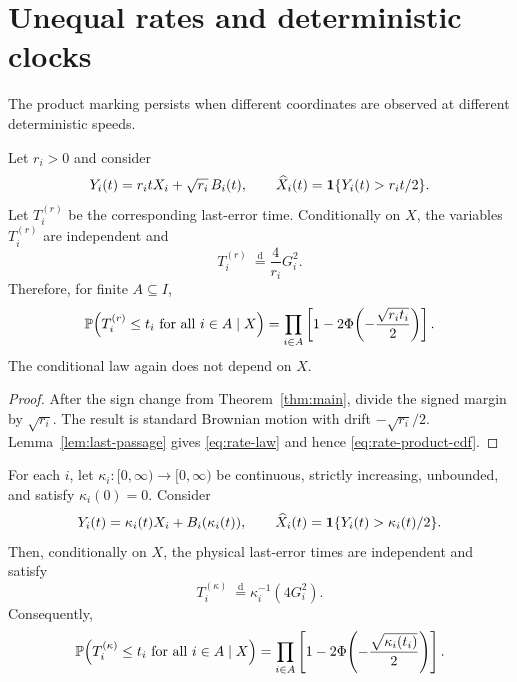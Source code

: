 \section{Unequal rates and deterministic clocks}

The product marking persists when different coordinates are observed at
different deterministic speeds.

\begin{proposition}\label{prop:rates}
Let $r_i>0$ and consider
\begin{equation}\label{eq:rate-model}
  Y_i(t)=r_itX_i+\sqrt{r_i}\,B_i(t),
  \qquad
  \widehat X_i(t)=\1\{Y_i(t)>r_it/2\}.
\end{equation}
Let $T_i^{(r)}$ be the corresponding last-error time.  Conditionally on $X$,
the variables $T_i^{(r)}$ are independent and
\begin{equation}\label{eq:rate-law}
  T_i^{(r)}\ \stackrel{\mathrm d}{=}\frac4{r_i}G_i^2.
\end{equation}
Therefore, for finite $A\subseteq I$,
\begin{equation}\label{eq:rate-product-cdf}
  \P\!\left(T_i^{(r)}\le t_i\ \text{for all }i\in A\mid X\right)
  =\prod_{i\in A}
  \left[1-2\Phi\!\left(-\frac{\sqrt{r_it_i}}2\right)\right].
\end{equation}
The conditional law again does not depend on $X$.
\end{proposition}

\begin{proof}
After the sign change from Theorem~\ref{thm:main}, divide the signed margin by
$\sqrt{r_i}$.  The result is standard Brownian motion with drift
$-\sqrt{r_i}/2$.  Lemma~\ref{lem:last-passage} gives
\eqref{eq:rate-law} and hence \eqref{eq:rate-product-cdf}.
\end{proof}

\begin{proposition}\label{prop:clocks}
For each $i$, let $\kappa_i:[0,\infty)\to[0,\infty)$ be continuous, strictly
increasing, unbounded, and satisfy $\kappa_i(0)=0$.  Consider
\begin{equation}\label{eq:clock-model}
  Y_i(t)=\kappa_i(t)X_i+B_i(\kappa_i(t)),
  \qquad
  \widehat X_i(t)=\1\{Y_i(t)>\kappa_i(t)/2\}.
\end{equation}
Then, conditionally on $X$, the physical last-error times are independent and
satisfy
\begin{equation}\label{eq:clock-transform}
  T_i^{(\kappa)}\ \stackrel{\mathrm d}{=}
  \kappa_i^{-1}(4G_i^2).
\end{equation}
Consequently,
\begin{equation}\label{eq:clock-product-cdf}
  \P\!\left(T_i^{(\kappa)}\le t_i\ \text{for all }i\in A\mid X\right)
  =\prod_{i\in A}
  \left[1-2\Phi\!\left(-\frac{\sqrt{\kappa_i(t_i)}}2\right)\right].
\end{equation}
\end{proposition}


